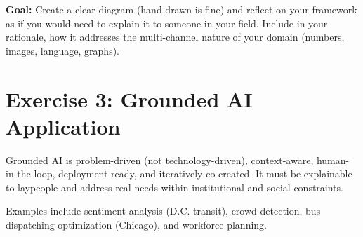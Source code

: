 \documentclass[11pt]{article}
\begin{document}
\noindent\textbf{Goal:} Create a clear diagram (hand-drawn is fine) and reflect on your framework as if you would need to explain it to someone in your field. Include in your rationale, how it addresses the multi-channel nature of your domain (numbers, images, language, graphs). 

\section*{Exercise 3: Grounded AI Application}

Grounded AI is problem-driven (not technology-driven), context-aware, human-in-the-loop, deployment-ready, and iteratively co-created. It must be explainable to laypeople and address real needs within institutional and social constraints.

Examples include sentiment analysis (D.C. transit), crowd detection, bus dispatching optimization (Chicago), and workforce planning.
\end{document}
